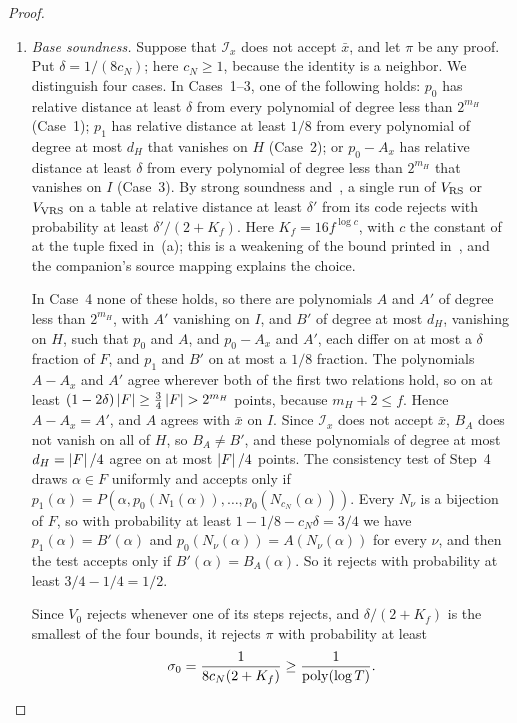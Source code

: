 \begin{proof}
\begin{enumerate}[label=(\alph*)]
accepts \(\pi\) with probability one.
\item \emph{Base soundness.} Suppose that \(\mathcal I_x\) does not
accept \(\bar x\), and let \(\pi\) be any proof. Put
\(\delta=1/(8c_N)\); here \(c_N\ge1\), because the identity is a
neighbor. We distinguish four cases. In Cases~1--3, one of the following
holds: \(p_0\) has relative distance at least \(\delta\) from every
polynomial of degree less than \(2^{m_H}\) (Case~1); \(p_1\) has relative
distance at least \(1/8\) from every polynomial of degree at most \(d_H\)
that vanishes on \(H\) (Case~2); or \(p_0-A_x\) has relative distance at
least \(\delta\) from every polynomial of degree less than \(2^{m_H}\)
that vanishes on \(I\) (Case~3). By strong soundness
\cite[Definition~4.15]{BCGT13} and~\cite[Theorem~11.1]{BCGT13}, a single
run of \(V_{\rm RS}\) or \(V_{\rm VRS}\) on a table at relative distance
at least \(\delta'\) from its code rejects with probability at least
\(\delta'/(2+K_f)\). Here \(K_f=16f^{\log c}\), with \(c\) the constant of~\cite[Theorem~11.3]{BCGT13} at the tuple fixed in~(a); this is a weakening of the bound printed in~\cite[Theorem~11.1]{BCGT13}, and the companion's source mapping explains the choice.

In Case~4 none of these holds, so there are polynomials \(A\) and
\(A'\) of degree less than \(2^{m_H}\), with \(A'\) vanishing on \(I\),
and \(B'\) of degree at most \(d_H\), vanishing on \(H\), such that
\(p_0\) and \(A\), and \(p_0-A_x\) and \(A'\), each differ on at most a
\(\delta\) fraction of \(F\), and \(p_1\) and \(B'\) on at most a
\(1/8\) fraction. The polynomials \(A-A_x\) and \(A'\) agree wherever
both of the first two relations hold, so on at least
\((1-2\delta)\abs F\ge\frac34\abs F>2^{m_H}\) points, because
\(m_H+2\le f\). Hence \(A-A_x=A'\), and \(A\) agrees with \(\bar x\) on
\(I\). Since \(\mathcal I_x\) does not accept \(\bar x\), \(B_A\) does not
vanish on all of \(H\), so \(B_A\ne B'\), and these polynomials of degree
at most \(d_H=\left|F\right|/4\) agree on at most \(\left|F\right|/4\) points. The
consistency test of Step~4 draws \(\alpha\in F\) uniformly and accepts
only if \(p_1(\alpha)=P(\alpha,p_0(N_1(\alpha)),\ldots,
p_0(N_{c_N}(\alpha)))\). Every \(N_\nu\) is a bijection of \(F\), so with
probability at least \(1-1/8-c_N\delta=3/4\) we have
\(p_1(\alpha)=B'(\alpha)\) and \(p_0(N_\nu(\alpha))=A(N_\nu(\alpha))\) for
every \(\nu\), and then the test accepts only if
\(B'(\alpha)=B_A(\alpha)\). So it rejects with probability at least
\(3/4-1/4=1/2\).

Since \(V_0\) rejects whenever one of its steps rejects, and
\(\delta/(2+K_f)\) is the smallest of the four bounds, it rejects \(\pi\)
with probability at least
\[
 \sigma_0=\frac1{8c_N(2+K_f)}\ge\frac1{\operatorname{poly}(\log T)}.
\]
\end{enumerate}


\end{proof}
